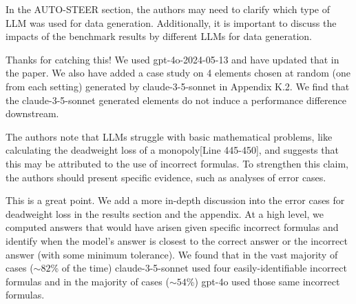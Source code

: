 \documentclass[12pt]{rebuttal_style}
\newcommand{\narun}[1]{\ColorNote{red}{Narun}{#1}}
\begin{document}
\nextreviewer

\begin{revcomment}
    In the AUTO-STEER section, the authors may need to clarify which type of LLM was used for data generation. Additionally, it is important to discuss the impacts of the benchmark results by different LLMs for data generation.
\end{revcomment}
\begin{response}
    Thanks for catching this! We used gpt-4o-2024-05-13 and have updated that in the paper.
    We also have added a case study on 4 elements chosen at random (one from each setting) generated by claude-3-5-sonnet in Appendix K.2. We find that the claude-3-5-sonnet generated elements do not induce a performance difference downstream.
\end{response}

\begin{revcomment}
    The authors note that LLMs struggle with basic mathematical problems, like calculating the deadweight loss of a monopoly[Line 445-450], and suggests that this may be attributed to the use of incorrect formulas. To strengthen this claim, the authors should present specific evidence, such as analyses of error cases.
\end{revcomment}
\begin{response}
    This is a great point. We add a more in-depth discussion into the error cases for deadweight loss in the results section and the appendix. At a high level, we computed answers that would have arisen given specific incorrect formulas and identify when the model's answer is closest to the correct answer or the incorrect answer (with some minimum tolerance). We found that in the vast majority of cases ($\sim82$\% of the time) claude-3-5-sonnet used four easily-identifiable incorrect formulas and in the majority of cases ($\sim54$\%) gpt-4o used those same incorrect formulas.
    
\end{response}
\end{document}
